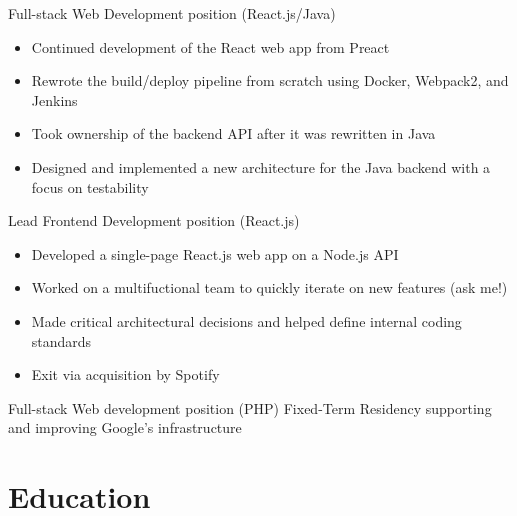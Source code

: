 	{Full-stack Web Development position (React.js/Java)}{
	\begin{itemize}
	\item Continued development of the React web app from Preact
	\item Rewrote the build/deploy pipeline from scratch using Docker, Webpack2, and Jenkins
	\item Took ownership of the backend API after it was rewritten in Java
	\item Designed and implemented a new architecture for the Java backend with a focus on testability
	\end{itemize}
}
	{Lead Frontend Development position (React.js)}{
	\begin{itemize}
	\item Developed a single-page React.js web app on a Node.js API
	\item Worked on a multifuctional team to quickly iterate on new features (ask me!)
	\item Made critical architectural decisions and helped define internal coding standards
	\item Exit via acquisition by Spotify
	\end{itemize}
}
	{Full-stack Web development position (PHP)}{}
	{Fixed-Term Residency supporting and improving Google's infrastructure}{}

\section{Education}

